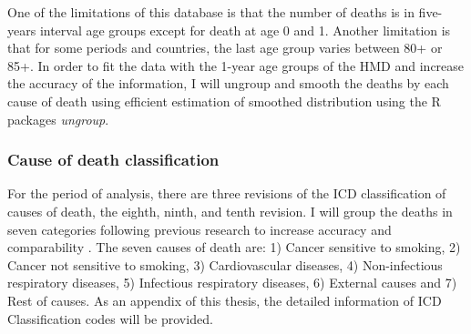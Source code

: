 \documentclass[12pt,a4paper]{article}
\begin{document}
One of the limitations of this database is that the number of deaths is in five-years interval age groups except for death at age 0 and 1. Another limitation is that for some periods and countries, the last age group varies between 80+ or 85+. In order to fit the data with the 1-year age groups of the HMD and increase the accuracy of the information, I will ungroup and smooth the deaths by each cause of death using efficient estimation of smoothed distribution using the R packages  \textit{ungroup}\citep{Rizzi15, Rizzi16}.


\subsubsection{Cause of death classification}

For the period of analysis, there are three revisions of the ICD classification of causes of death, the eighth, ninth, and tenth revision. I will group the deaths in seven categories following previous research to increase accuracy and comparability \citep{Janssen04, JM2018-2}. The seven causes of death are: 1) Cancer sensitive to smoking, 2) Cancer not sensitive to smoking, 3) Cardiovascular diseases, 4) Non-infectious respiratory diseases, 5) Infectious respiratory diseases, 6) External causes and 7) Rest of causes. As an appendix of this thesis, the detailed information of ICD Classification codes will be provided.


\end{document}
